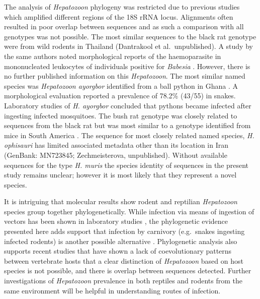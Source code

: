 \documentclass[a4paper, nobind]{templates/ociamthesis}
\begin{document}
The analysis of \emph{Hepatozoon} phylogeny was restricted due to previous studies which amplified different regions of the 18S rRNA locus.
Alignments often resulted in poor overlap between sequences and as such a comparison with all genotypes was not possible.
The most similar sequences to the black rat genotype were from wild rodents in Thailand (Dantrakool et al.~unpublished).
A study by the same authors noted morphological reports of the haemoparasite in mononucleated leukocytes of individuals positive for \emph{Babesia} \autocite{dantrakoolIdentificationNewType2004}.
However, there is no further published information on this \emph{Hepatozoon}. The most similar named species was \emph{Hepatozoon ayorgbor} identified from a ball python in Ghana \autocite{slobodaNEWSPECIESHEPATOZOON2007}.
A morphological evaluation reported a prevalence of 78.2\% (43/55) in snakes.
Laboratory studies of \emph{H. ayorgbor} concluded that pythons became infected after ingesting infected mosquitoes.
The bush rat genotype was closely related to sequences from the black rat but was most similar to a genotype identified from mice in South America \autocite{merinoMolecularCharacterizationAncient2009}.
The sequence for most closely related named species, \emph{H. ophisauri} has limited associated metadata other than its location in Iran (GenBank: MN723845; Zechmeisterova, unpublished).
Without available sequences for the type \emph{H. muris} the species identity of sequences in the present study remains unclear; however it is most likely that they represent a novel species.

It is intriguing that molecular results show rodent and reptilian \emph{Hepatozoon} species group together phylogenetically.
While infection via means of ingestion of vectors has been shown in laboratory studies \autocite{slobodaNEWSPECIESHEPATOZOON2007}, the phylogenetic evidence presented here adds support that infection by carnivory (e.g.~snakes ingesting infected rodents) is another possible alternative \autocite{harrisPrevalenceDiversityHepatozoon2015}.
Phylogenetic analysis also supports recent studies that have shown a lack of coevolutionary patterns between vertebrate hosts \autocite{maiaMOLECULARASSESSMENTHEPATOZOON2014,harrisPrevalenceDiversityHepatozoon2015}
that a clear distinction of \emph{Hepatozoon} based on host species is not possible, and there is overlap between sequences detected.
Further investigations of \emph{Hepatozoon} prevalence in both reptiles and rodents from the same environment will be helpful in understanding routes of infection.
\end{document}
